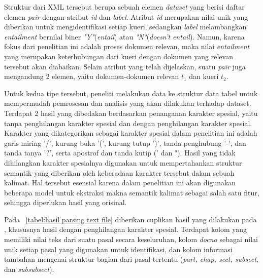 Struktur dari XML \file{} tersebut berupa sebuah elemen \textit{dataset} yang berisi daftar elemen \textit{pair} dengan atribut \textit{id} dan \textit{label}. Atribut \textit{id} merupakan nilai unik yang diberikan untuk mengidentifikasi setiap kueri, sedangkan \textit{label} melambangkan \textit{entailment} bernilai biner \textit{"Y"}(\textit{entail}) atau \textit{"N"}(\textit{doesn't} \textit{entail}). Namun, karena fokus dari penelitian ini adalah proses \retrieval{} dokumen relevan, maka nilai \textit{entailment} yang merupakan keterhubungan dari kueri dengan dokumen yang relevan tersebut akan diabaikan. Selain atribut yang telah dijelaskan, suatu \textit{pair} juga mengandung 2 elemen, yaitu dokumen-dokumen relevan \(t_1\) dan kueri \(t_2\).

Untuk kedua tipe \file{} tersebut, peneliti melakukan \parsing{} data ke struktur data tabel untuk mempermudah pemrosesan dan analisis yang akan dilakukan terhadap dataset. Terdapat 2 hasil \parsing{} yang dibedakan berdasarkan penanganan karakter spesial, yaitu tanpa penghilangan karakter spesial dan dengan penghilangan karakter spesial. Karakter yang dikategorikan sebagai karakter spesial dalam penelitian ini adalah garis miring '/', kurung buka '(', kurung tutup ')', tanda penghubung '-', dan tanda tanya '?', serta apostrof dan tanda kutip (' dan "). Hasil \parsing{} yang tidak dihilangkan karakter spesialnya digunakan untuk mempertahankan struktur semantik yang diberikan oleh keberadaan karakter tersebut dalam sebuah kalimat. Hal tersebut esensial karena dalam penelitian ini akan digunakan beberapa model \nn{} untuk ekstraksi makna semantik kalimat sebagai salah satu fitur, sehingga diperlukan hasil \parsing{} yang orisinal.

Pada \tabel{}~\ref{tabel:hasil parsing text file} diberikan cuplikan hasil \parsing{} yang dilakukan pada \txt{} \file{}, khususnya hasil dengan penghilangan karakter spesial. Terdapat kolom \txt{} yang memiliki nilai teks dari suatu pasal secara keseluruhan, kolom \textit{docno} sebagai nilai unik setiap pasal yang digunakan untuk identifikasi, dan kolom informasi tambahan mengenai struktur bagian dari pasal tertentu (\textit{part, chap, sect, subsect,} dan \textit{subsubsect}).

